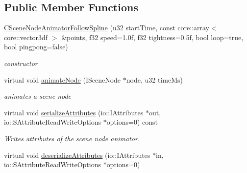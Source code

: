 \subsection*{Public Member Functions}
\begin{DoxyCompactItemize}
\item 
\hypertarget{classirr_1_1scene_1_1_c_scene_node_animator_follow_spline_a6a1a6c9b12707e53d802edc7ccd55d64}{\hyperlink{classirr_1_1scene_1_1_c_scene_node_animator_follow_spline_a6a1a6c9b12707e53d802edc7ccd55d64}{C\-Scene\-Node\-Animator\-Follow\-Spline} (u32 start\-Time, const core\-::array$<$ core\-::vector3df $>$ \&points, f32 speed=1.\-0f, f32 tightness=0.\-5f, bool loop=true, bool pingpong=false)}\label{classirr_1_1scene_1_1_c_scene_node_animator_follow_spline_a6a1a6c9b12707e53d802edc7ccd55d64}

\begin{DoxyCompactList}\small\item\em constructor \end{DoxyCompactList}\item 
\hypertarget{classirr_1_1scene_1_1_c_scene_node_animator_follow_spline_a6652b9b2dc467e1d8e2a66dedb2ac814}{virtual void \hyperlink{classirr_1_1scene_1_1_c_scene_node_animator_follow_spline_a6652b9b2dc467e1d8e2a66dedb2ac814}{animate\-Node} (I\-Scene\-Node $\ast$node, u32 time\-Ms)}\label{classirr_1_1scene_1_1_c_scene_node_animator_follow_spline_a6652b9b2dc467e1d8e2a66dedb2ac814}

\begin{DoxyCompactList}\small\item\em animates a scene node \end{DoxyCompactList}\item 
\hypertarget{classirr_1_1scene_1_1_c_scene_node_animator_follow_spline_a73eeba6a545eb46c0d89167ea3bd3a6d}{virtual void \hyperlink{classirr_1_1scene_1_1_c_scene_node_animator_follow_spline_a73eeba6a545eb46c0d89167ea3bd3a6d}{serialize\-Attributes} (io\-::\-I\-Attributes $\ast$out, io\-::\-S\-Attribute\-Read\-Write\-Options $\ast$options=0) const }\label{classirr_1_1scene_1_1_c_scene_node_animator_follow_spline_a73eeba6a545eb46c0d89167ea3bd3a6d}

\begin{DoxyCompactList}\small\item\em Writes attributes of the scene node animator. \end{DoxyCompactList}\item 
\hypertarget{classirr_1_1scene_1_1_c_scene_node_animator_follow_spline_a3d271f65877dc09aa4f4c2a96d5d06e9}{virtual void \hyperlink{classirr_1_1scene_1_1_c_scene_node_animator_follow_spline_a3d271f65877dc09aa4f4c2a96d5d06e9}{deserialize\-Attributes} (io\-::\-I\-Attributes $\ast$in, io\-::\-S\-Attribute\-Read\-Write\-Options $\ast$options=0)}\label{classirr_1_1scene_1_1_c_scene_node_animator_follow_spline_a3d271f65877dc09aa4f4c2a96d5d06e9}


\end{DoxyCompactItemize}
